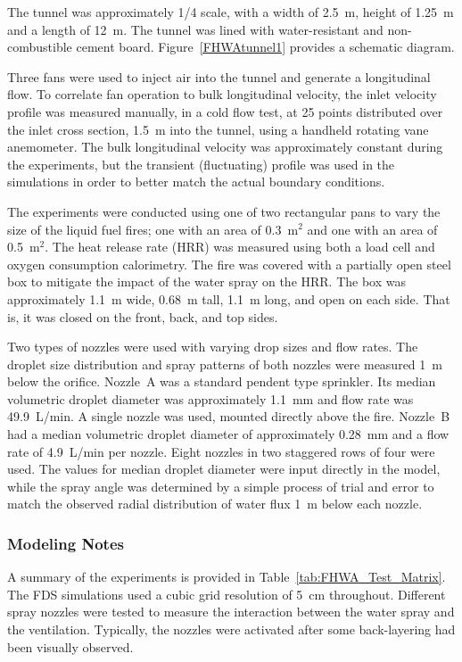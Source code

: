 The tunnel was approximately 1/4 scale, with a width of 2.5~m, height of 1.25~m and a length of 12~m. The tunnel was lined with water-resistant and non-combustible cement board. Figure~\ref{FHWAtunnel1} provides a schematic diagram.

Three fans were used to inject air into the tunnel and generate a longitudinal flow. To correlate fan operation to bulk longitudinal velocity, the inlet velocity profile was measured manually, in a cold flow test, at 25 points distributed over the inlet cross section, 1.5~m into the tunnel, using a handheld rotating vane anemometer. The bulk longitudinal velocity was approximately constant during the experiments, but the transient (fluctuating) profile was used in the simulations in order to better match the actual boundary conditions.

The experiments were conducted using one of two rectangular pans to vary the size of the liquid fuel fires; one with an area of 0.3~m$^2$ and one with an area of 0.5~m$^2$. The heat release rate (HRR) was measured using both a load cell and oxygen consumption calorimetry. The fire was covered with a partially open steel box to mitigate the impact of the water spray on the HRR. The box was approximately 1.1~m wide, 0.68~m tall, 1.1~m long, and open on each side. That is, it was closed on the front, back, and top sides.

Two types of nozzles were used with varying drop sizes and flow rates. The droplet size distribution and spray patterns of both nozzles were measured 1~m below the orifice. Nozzle~A was a standard pendent type sprinkler. Its median volumetric droplet diameter was approximately 1.1~mm and flow rate was 49.9~L/min. A single nozzle was used, mounted directly above the fire. Nozzle~B had a median volumetric droplet diameter of approximately 0.28~mm and a flow rate of 4.9~L/min per nozzle. Eight nozzles in two staggered rows of four were used. The values for median droplet diameter were input directly in the model, while the spray angle was determined by a simple process of trial and error to match the observed radial distribution of water flux 1~m below each nozzle.

\subsubsection{Modeling Notes}

A summary of the experiments is provided in Table~\ref{tab:FHWA_Test_Matrix}. The FDS simulations used a cubic grid resolution of 5~cm throughout. Different spray nozzles were tested to measure the interaction between the water spray and the ventilation. Typically, the nozzles were activated after some back-layering had been visually observed.



